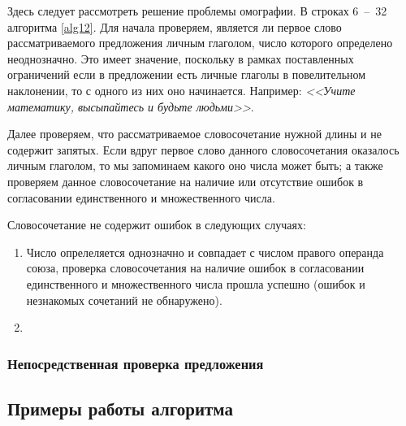 \documentclass[main]{subfiles}
\begin{document}
Здесь следует рассмотреть решение проблемы омографии. В строках 6~--~32 алгоритма \ref{alg12}. Для начала проверяем, является ли первое слово рассматриваемого предложения личным глаголом, число которого определено неоднозначно. Это имеет значение, поскольку в рамках поставленных ограничений если в предложении есть личные глаголы в повелительном наклонении, то с одного из них оно начинается. Например: \textit{<<Учите математику, высыпайтесь и будьте людьми>>}.

Далее проверяем, что рассматриваемое словосочетание нужной длины и не содержит запятых. Если вдруг первое слово данного словосочетания оказалось личным глаголом, то мы запоминаем какого оно числа может быть; а также проверяем данное словосочетание на наличие или отсутствие ошибок в согласовании единственного и множественного числа.

Словосочетание не содержит ошибок в следующих случаях:\begin{enumerate}
	\item Число опрелеляется однозначно и совпадает с числом правого операнда союза, проверка словосочетания на наличие ошибок в согласовании единственного и множественного числа прошла успешно (ошибок и незнакомых сочетаний не обнаружено).
	\item 
\end{enumerate}

\subsubsection{Непосредственная проверка предложения}
\subsection{Примеры работы алгоритма}
\end{document}
